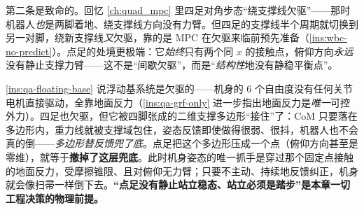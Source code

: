 第二条是致命的。回忆 \cref{ch:quad_mpc} 里四足对角步态“绕支撑线欠驱”——那时机器人\emph{也}是两脚着地、绕支撑线方向没有力臂。但四足的支撑线半个周期就切换到另一对脚，绕新支撑线\emph{又}欠驱，靠的是 MPC 在欠驱来临前预先准备（\cref{ins:wbc-no-predict}）。点足的处境更极端：它\emph{始终}只有两个同 $x$ 的接触点，俯仰方向\emph{永远}没有静止支撑力臂——这不是“间歇欠驱”，而是“\emph{结构性}地没有静稳平衡点”。

\begin{insight}\label{ins:lb-no-static}
\cref{ins:qa-floating-base} 说浮动基系统是欠驱的——机身的 $6$ 个自由度没有任何关节电机直接驱动，全靠地面反力（\cref{ins:qa-grf-only} 进一步指出地面反力是\emph{唯一}可控外力）。四足也欠驱，但它被四脚张成的二维支撑多边形“接住”了：CoM 只要落在多边形内，重力线就被支撑域包住，姿态反馈即使做得很弱、很抖，机器人也不会真的倒——\emph{多边形替反馈兜了底}。点足把这个多边形压成一个点（俯仰方向甚至是零维），就等于\textbf{撤掉了这层兜底}。此时机身姿态的唯一抓手是穿过那个固定点接触的地面反力，受摩擦锥限、且对俯仰无力臂；只要不主动、持续地反馈纠正，机身就会像扫帚一样倒下去。\textbf{“点足没有静止站立稳态、站立必须是踏步”是本章一切工程决策的物理前提。}
\end{insight}

